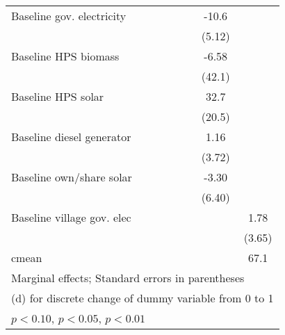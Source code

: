 \begin{table}[htbp]
\begin{tabular*}{1\hsize}{@{\hskip\tabcolsep\extracolsep\fill}l*{6}{c}}
Baseline gov. electricity&                  &                  &                  &                  &    -10.6\sym{**} &                  \\
                &                  &                  &                  &                  &   (5.12)         &                  \\
Baseline HPS biomass&                  &                  &                  &                  &    -6.58         &                  \\
                &                  &                  &                  &                  &   (42.1)         &                  \\
Baseline HPS solar&                  &                  &                  &                  &     32.7         &                  \\
                &                  &                  &                  &                  &   (20.5)         &                  \\
Baseline diesel generator&                  &                  &                  &                  &     1.16         &                  \\
                &                  &                  &                  &                  &   (3.72)         &                  \\
Baseline own/share solar&                  &                  &                  &                  &    -3.30         &                  \\
                &                  &                  &                  &                  &   (6.40)         &                  \\
Baseline village gov. elec&                  &                  &                  &                  &                  &     1.78         \\
                &                  &                  &                  &                  &                  &   (3.65)         \\
\midrule
cmean           &                  &                  &                  &                  &                  &     67.1         \\
\bottomrule
\multicolumn{7}{l}{\footnotesize Marginal effects; Standard errors in parentheses}\\
\multicolumn{7}{l}{\footnotesize  (d) for discrete change of dummy variable from 0 to 1}\\
\multicolumn{7}{l}{\footnotesize \sym{*} \(p<0.10\), \sym{**} \(p<0.05\), \sym{***} \(p<0.01\)}\\
\end{tabular*}
\end{table}

